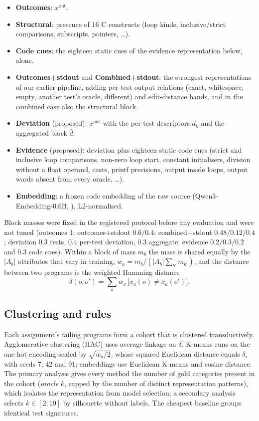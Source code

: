 \documentclass[a4paper,preprint,12pt,authoryear]{elsarticle}
\begin{document}
\begin{itemize}
\item \textbf{Outcomes}: $x^{\mathrm{out}}$.
\item \textbf{Structural}: presence of 16 C constructs (loop kinds, inclusive/strict comparisons, subscripts, pointers, \dots).
\item \textbf{Code cues}: the eighteen static cues of the evidence representation below, alone.
\item \textbf{Outcomes+stdout} and \textbf{Combined+stdout}: the strongest representations of our earlier pipeline, adding per-test output relations (exact, whitespace, empty, another test's oracle, different) and edit-distance bands, and in the combined case also the structural block.
\item \textbf{Deviation} (proposed): $x^{\mathrm{out}}$ with the per-test descriptors $d_k$ and the aggregated block $\bar d$.
\item \textbf{Evidence} (proposed): deviation plus eighteen static code cues (strict and inclusive loop comparisons, non-zero loop start, constant initialisers, division without a float operand, casts, printf precisions, output inside loops, output words absent from every oracle, \dots).
\item \textbf{Embedding}: a frozen code embedding of the raw source (Qwen3-Embedding-0.6B, \citealt{zhang2025qwen3embedding}), L2-normalised.
\end{itemize}
Block masses were fixed in the registered protocol before any evaluation and were not tuned (outcomes $1$; outcomes+stdout $0.6/0.4$; combined+stdout $0.48/0.12/0.4$; deviation $0.3$ tests, $0.4$ per-test deviation, $0.3$ aggregate; evidence $0.2/0.3/0.2$ and $0.3$ code cues). Within a block of mass $m_b$ the mass is shared equally by the $|A_b|$ attributes that vary in training, $w_a = m_b / (|A_b| \sum_{b'} m_{b'})$, and the distance between two programs is the weighted Hamming distance
\begin{equation}
\delta(o, o') = \sum_{a} w_a \,\bigl[x_a(o) \neq x_a(o')\bigr].
\end{equation}

\subsection{Clustering and rules}
Each assignment's failing programs form a cohort that is clustered transductively. Agglomerative clustering (HAC) uses average linkage on $\delta$. K-means runs on the one-hot encoding scaled by $\sqrt{w_a/2}$, whose squared Euclidean distance equals $\delta$, with seeds 7, 42 and 91; embeddings use Euclidean K-means and cosine distance. The primary analysis gives every method the number of gold categories present in the cohort (\emph{oracle} $k$, capped by the number of distinct representation patterns), which isolates the representation from model selection; a secondary analysis selects $k\in[2,10]$ by silhouette without labels. The cheapest baseline groups identical test signatures.
\end{document}
